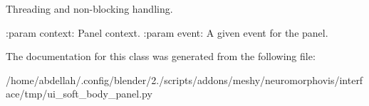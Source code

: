 \begin{DoxyVerb}Threading and non-blocking handling.

:param context: Panel context.
:param event: A given event for the panel.
\end{DoxyVerb}
 

The documentation for this class was generated from the following file\+:\begin{DoxyCompactItemize}
\item 
/home/abdellah/.\+config/blender/2./scripts/addons/meshy/neuromorphovis/interface/tmp/ui\+\_\+soft\+\_\+body\+\_\+panel.\+py\end{DoxyCompactItemize}
